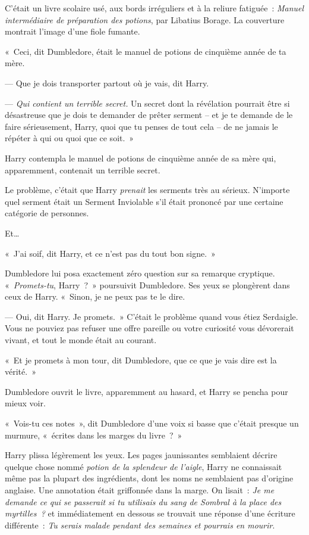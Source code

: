 C'était un livre scolaire usé, aux bords irréguliers et à la reliure fatiguée~: \emph{Manuel intermédiaire de préparation des potions}, par Libatius Borage.
La couverture montrait l'image d'une fiole fumante.

«~Ceci, dit Dumbledore, était le manuel de potions de cinquième année de ta mère.

--- Que je dois transporter partout où je vais, dit Harry.

--- \emph{Qui contient un terrible secret.}
Un secret dont la révélation pourrait être si désastreuse que je dois te demander de prêter serment -- et je te demande de le faire sérieusement, Harry, quoi que tu penses de tout cela -- de ne jamais le répéter à qui ou quoi que ce soit.~»

Harry contempla le manuel de potions de cinquième année de sa mère qui, apparemment, contenait un terrible secret.

Le problème, c'était que Harry \emph{prenait} les serments très au sérieux.
N'importe quel serment était un Serment Inviolable s'il était prononcé par une certaine catégorie de personnes.

Et…

«~J'ai soif, dit Harry, et ce n'est pas du tout bon signe.~»

Dumbledore lui posa exactement zéro question sur sa remarque cryptique.
«~\emph{Promets-tu}, Harry~?~» poursuivit Dumbledore.
Ses yeux se plongèrent dans ceux de Harry.
«~Sinon, je ne peux pas te le dire.

--- Oui, dit Harry. Je promets.~»
C'était le problème quand vous étiez Serdaigle.
Vous ne pouviez pas refuser une offre pareille ou votre curiosité vous dévorerait vivant, et tout le monde était au courant.

«~Et je promets à mon tour, dit Dumbledore, que ce que je vais dire est la vérité.~»

Dumbledore ouvrit le livre, apparemment au hasard, et Harry se pencha pour mieux voir.

«~Vois-tu ces notes~», dit Dumbledore d'une voix si basse que c'était presque un murmure, «~écrites dans les marges du livre~?~»

Harry plissa légèrement les yeux.
Les pages jaunissantes semblaient décrire quelque chose nommé \emph{potion de la splendeur de l'aigle}, Harry ne connaissait même pas la plupart des ingrédients, dont les noms ne semblaient pas d'origine anglaise.
Une annotation était griffonnée dans la marge.
On lisait~: \emph{Je me demande ce qui se passerait si tu utilisais du sang de Sombral à la place des myrtilles~?} et immédiatement en dessous se trouvait une réponse d'une écriture différente~: \emph{Tu serais malade pendant des semaines et pourrais en mourir}.

